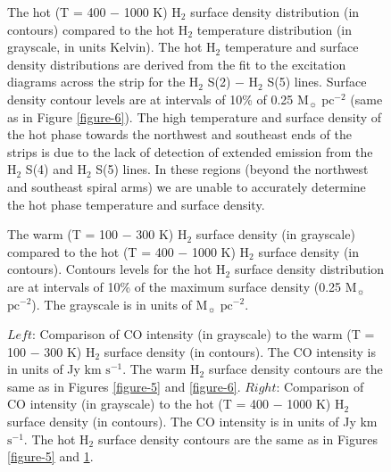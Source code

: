 \documentclass[12pt,preprint]{aastex}
\begin{document}
\clearpage
\begin{figure}
\caption{The hot (T = 400 $-$ 1000 K) H$_2$ surface density distribution (in contours) 
compared to the hot H$_2$ temperature distribution (in grayscale, in units Kelvin).  
The hot H$_2$ temperature and surface density distributions are derived from the 
fit to the excitation diagrams across the strip for the H$_2$ S(2) $-$ H$_2$ S(5) lines.  Surface density 
contour levels are at intervals of 10\% of 0.25 $\mathrm{M_\sun}$ $\mathrm{pc^{-2}}$ (same as in Figure \ref{figure-6}).  The high temperature and surface density of the hot phase towards the northwest and southeast ends of the strips is due to the lack of detection of extended emission from the H$_2$ S(4) and H$_2$ S(5) lines.  In these regions (beyond the northwest and southeast spiral arms) we are unable to accurately determine the hot phase temperature and surface density.}
\label{figure-7}
\end{figure}

\clearpage

\begin{figure}
\caption{The warm (T = 100 $-$ 300 K) H$_2$ surface density (in grayscale) compared to
 the hot (T = 400 $-$ 1000 K) H$_2$ surface density (in contours).  Contours levels for the 
 hot H$_2$ surface density distribution are at intervals of 10\% of the maximum surface density 
 (0.25 $\mathrm{M_\sun}$ $\mathrm{pc^{-2}}$).  The grayscale is in units of 
 $\mathrm{M_\sun}$ $\mathrm{pc^{-2}}$.}
\label{figure-8}
\end{figure}

\clearpage

\begin{figure}
\caption{$Left$: Comparison of  CO intensity (in grayscale) to the warm (T = 100 $-$ 300 K) 
H$_2$ surface density (in contours).  The CO intensity is in units of Jy km $\mathrm{s^{-1}}$. 
The warm H$_2$ surface density contours are the same as in Figures \ref{figure-5} and \ref{figure-6}.  
$Right$: Comparison of CO intensity (in grayscale) to the hot (T = 400 $-$ 1000 K) 
H$_2$ surface density (in contours).  The CO intensity is in units of Jy km 
$\mathrm{s^{-1}}$. The hot H$_2$ surface density contours are the same as in 
Figures \ref{figure-5} and \ref{figure-7}.}
\label{figure-9}
\end{figure}

\clearpage
\end{document}
